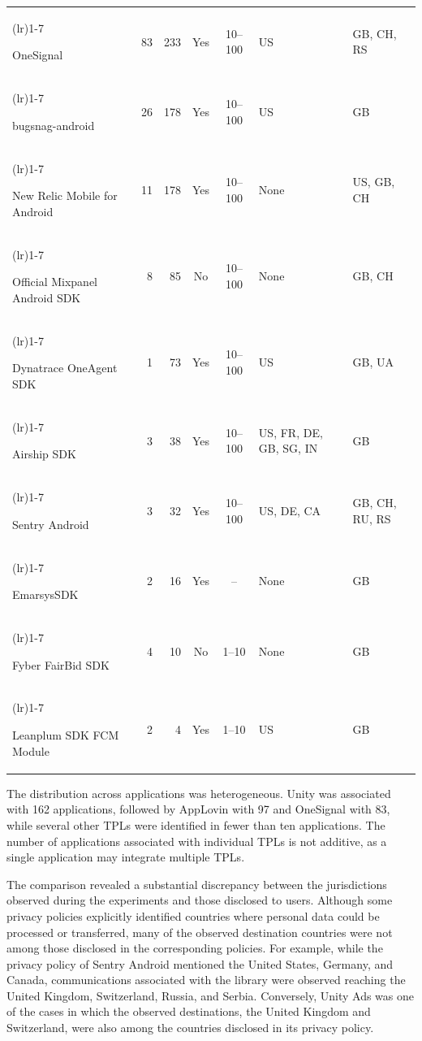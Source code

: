 \documentclass[
A4paper,                %
twoside,                %
openright,              %
chapterprefix=true,     %
12pt,                   %
headings=normal,        %
titlepage=on            %
]{book}
\newcommand{\rowsep}[1]{%
    \arrayrulecolor{black!30}%
    \cmidrule[0.3pt](lr){1-#1}%
    \arrayrulecolor{black}%
}
\begin{document}
\begin{table}[ht]
\begin{tabularx}{\textwidth}{>{\raggedright\arraybackslash}p{3.3cm} r r c c >{\raggedright\arraybackslash}X >{\raggedright\arraybackslash}X}
        \rowsep{7}
        OneSignal & 83 & 233 & Yes & 10--100 & US & GB, CH, RS \\
        \rowsep{7}
        bugsnag-android & 26 & 178 & Yes & 10--100 & US & GB \\
        \rowsep{7}
        New Relic Mobile for Android & 11 & 178 & Yes & 10--100 & None & US, GB, CH \\
        \rowsep{7}
        Official Mixpanel Android SDK & 8 & 85 & No & 10--100 & None & GB, CH \\
        \rowsep{7}
        Dynatrace OneAgent SDK & 1 & 73 & Yes & 10--100 & US & GB, UA \\
        \rowsep{7}
        Airship SDK & 3 & 38 & Yes & 10--100 & US, FR, DE, GB, SG, IN & GB \\
        \rowsep{7}
        Sentry Android & 3 & 32 & Yes & 10--100 & US, DE, CA & GB, CH, RU, RS \\
        \rowsep{7}
        EmarsysSDK & 2 & 16 & Yes & -- & None & GB \\
        \rowsep{7}
        Fyber FairBid SDK & 4 & 10 & No & 1--10 & None & GB \\
        \rowsep{7}
        Leanplum SDK FCM Module & 2 & 4 & Yes & 1--10 & US & GB \\
        \bottomrule
    \end{tabularx}
\end{table}

The distribution across applications was heterogeneous. Unity was associated with 162 applications, followed by AppLovin with 97 and OneSignal with 83, while several other TPLs were identified in fewer than ten applications. The number of applications associated with individual TPLs is not additive, as a single application may integrate multiple TPLs.

The comparison revealed a substantial discrepancy between the jurisdictions observed during the experiments and those disclosed to users. Although some privacy policies explicitly identified countries where personal data could be processed or transferred, many of the observed destination countries were not among those disclosed in the corresponding policies. For example, while the privacy policy of Sentry Android mentioned the United States, Germany, and Canada, communications associated with the library were observed reaching the United Kingdom, Switzerland, Russia, and Serbia. Conversely, Unity Ads was one of the cases in which the observed destinations, the United Kingdom and Switzerland, were also among the countries disclosed in its privacy policy.
\end{document}
